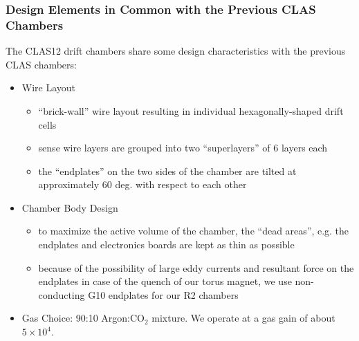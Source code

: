 \subsubsection{Design Elements in Common with the Previous CLAS Chambers}
The CLAS12 drift chambers share some design characteristics with the
previous CLAS chambers:
\begin{itemize}
\item Wire Layout
\begin{itemize}
\item ``brick-wall'' wire layout resulting in individual hexagonally-shaped
drift cells
\item sense wire layers are grouped into two ``superlayers'' of 6 layers each
\item the ``endplates'' on the two sides of the chamber are tilted 
at approximately 60 deg. with respect to each other
\end{itemize}
\item Chamber Body Design
\begin{itemize}
\item to maximize the active volume of the chamber, the ``dead areas'', e.g.
the endplates and electronics boards are kept as thin as possible
\item because of the possibility of large eddy currents and resultant
force on the endplates in case of the quench of our torus magnet, we
use non-conducting G10 endplates for our R2 chambers
\end{itemize}
\item Gas Choice: 90:10 Argon:CO$_2$ mixture.  We operate at a gas gain of 
about $5 \times 10^4$.
\end{itemize}


